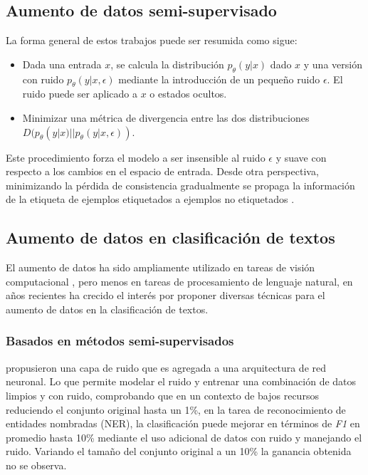 \subsection{Aumento de datos semi-supervisado}
La forma general de estos trabajos puede ser resumida como sigue:

\begin{itemize}
    \item Dada una entrada $x$, se calcula la distribución $p_\theta (y|x)$ dado $x$ y una versión con ruido $p_\theta (y|x, \epsilon)$ mediante la introducción de un pequeño ruido $\epsilon$. El ruido puede ser aplicado a $x$ o estados ocultos.
    \item Minimizar una métrica de divergencia entre las dos distribuciones $D (p_\theta (y|x) || p_\theta (y|x, \epsilon))$.
\end{itemize}

Este procedimiento forza el modelo a ser insensible al ruido $\epsilon$ y suave con respecto a los cambios en el espacio de entrada. Desde otra perspectiva, minimizando la pérdida de consistencia gradualmente se propaga la información de la etiqueta de ejemplos etiquetados a ejemplos no etiquetados \cite{Miyato2019}.


\subsection{Aumento de datos en clasificación de textos}

El aumento de datos ha sido ampliamente utilizado en tareas de visión computacional \cite{cubuk2019autoaugment}, pero menos en tareas de procesamiento de lenguaje natural, en años recientes ha crecido el interés por proponer diversas técnicas para el aumento de datos en la clasificación de textos.

\subsubsection{Basados en métodos semi-supervisados}

\cite{hedderich2018training} propusieron una capa de ruido que es agregada a una arquitectura de red neuronal. Lo que permite modelar el ruido y entrenar una combinación de datos limpios y con ruido, comprobando que en un contexto de bajos recursos reduciendo el conjunto original hasta un 1\%, en la tarea de reconocimiento de entidades nombradas (NER), la clasificación puede mejorar en términos de \textit{F1} en promedio hasta 10\% mediante el uso adicional de datos con ruido y manejando el ruido. Variando el tamaño del conjunto original a un 10\% la ganancia obtenida no se observa. 

